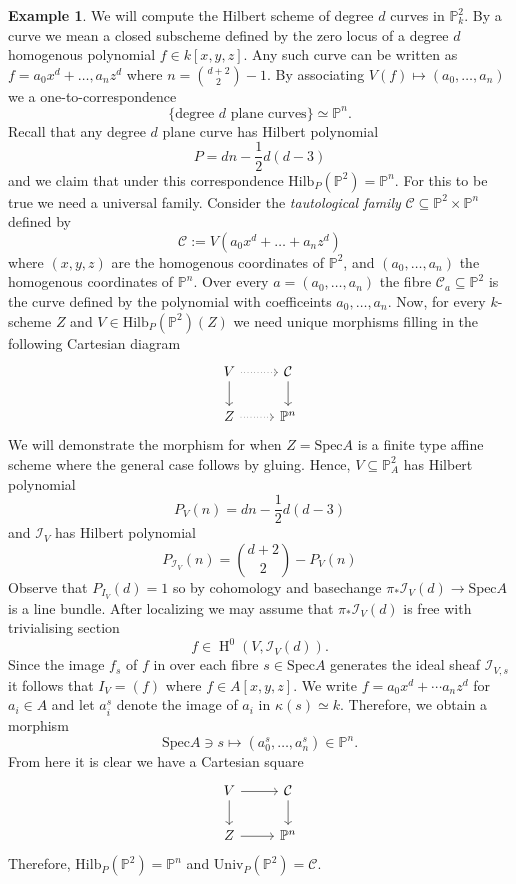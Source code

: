 \documentclass[12pt]{amsart}
\numberwithin{equation}{section}
\theoremstyle{definition}
\newtheorem{example}[theorem]{Example}
\newcommand{\cC}{\mathcal{C}}
\newcommand{\PP}{\mathbb{P}}
\newcommand{\HH}{\operatorname{H}}
\newcommand{\Hilb}{\mathrm{Hilb}}
\newcommand{\Univ}{\mathrm{Univ}}
\newcommand{\Spec}{\mathrm{Spec}}
\begin{document}
\begin{example} \label{hilb of degree d}
    We will compute the Hilbert scheme of degree $d$ curves in $\PP^2_k.$
    By a curve we mean a closed subscheme defined by the zero locus of a degree $d$ homogenous polynomial $f \in k[x,y,z]$.
    Any such curve can be written as 
    $
    f = a_0x^d + \ldots, a_nz^d
    $
    where $n = {{d+2}\choose{2}}-1.$
    By associating $V(f) \mapsto (a_0, \ldots, a_n)$ we a one-to-correspondence
    \[
    \{\text{degree $d$ plane curves}\} \simeq \PP^n.
    \]
    Recall that any degree $d$ plane curve has Hilbert polynomial
    \[
    P = dn - \frac{1}{2}d(d-3)
    \]
    and we claim that under this correspondence $\Hilb_P(\PP^2) = \PP^n.$
    For this to be true we need a universal family. 
    Consider the {\em tautological family} $\mathcal{C} \subseteq \PP^2 \times \PP^n$ defined by 
    \[
    \mathcal{C} := V(a_0x^d + \ldots + a_nz^d)
    \]
    where $(x,y,z)$ are the homogenous coordinates of $\PP^2$, and $(a_0, \ldots, a_n)$ the homogenous coordinates of $\PP^n.$
    Over every $a = (a_0, \ldots, a_n)$ the fibre $\mathcal{C}_a \subseteq \PP^2$ is the curve defined by the polynomial with coefficeints $a_0, \ldots, a_n$.
    Now, for every $k$-scheme $Z$ and $V \in \Hilb_P(\PP^2)(Z)$ we need unique morphisms filling in the following Cartesian diagram
    \[
    \begin{tikzcd}
    V \arrow[d] \arrow[r, dotted] & \cC \arrow[d] \\
    Z \arrow[r, dotted]           & \PP^n        
\end{tikzcd}
    \]
    We will demonstrate the morphism for when $Z = \Spec A$ is a finite type affine scheme where the general case follows by gluing.
    Hence, $V \subseteq \PP^2_A$ has Hilbert polynomial 
    \[
    P_V(n) = dn - \frac{1}{2}d(d-3)
    \]
    and $\mathcal{I}_V$ has Hilbert polynomial
    \[
    P_{\mathcal{I}_V}(n) = {{d+2}\choose{2}} - P_V(n)
    \]
    Observe that $P_{I_{V}}(d) = 1$ so by cohomology and basechange $\pi_* \mathcal{I}_V(d) \to \Spec A$ is a line bundle.
    After localizing we may assume that $\pi_* \mathcal{I}_V(d)$ is free with trivialising section
    \[
    f \in \HH^0(V, \mathcal{I}_V(d)).
    \]
    Since the image $f_s$ of $f$ in over each fibre $s \in \Spec A$ generates the ideal sheaf $\mathcal{I}_{V, s}$ it follows that $I_V = (f)$ where $f \in A[x,y,z].$
    We write $f = a_0 x^d + \cdots a_n z^d$ for $a_i \in A$ and let $a_i^s$ denote the image of $a_i$ in $\kappa(s) \simeq k.$ 
    Therefore, we obtain a morphism
    \[
    \Spec A \ni s \mapsto (a_0^s, \ldots, a_n^s) \in \PP^n.
    \]
    From here it is clear we have a Cartesian square
    \[
    \begin{tikzcd}
V \arrow[d] \arrow[r] & \cC \arrow[d] \\
Z \arrow[r]           & \PP^n        
\end{tikzcd}
    \]
    Therefore, $\Hilb_P(\PP^2) = \PP^n$ and $\Univ_P(\PP^2) = \mathcal{C}.$
\end{example}
\end{document}
